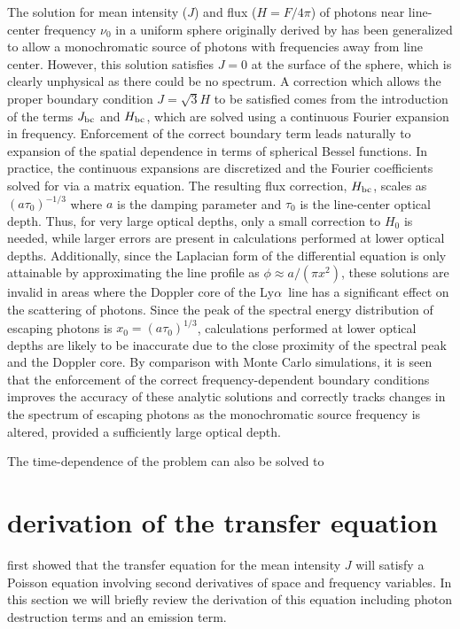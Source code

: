 \documentclass{aastex63}
\newcommand\lya{Ly$\alpha$\ }
\begin{document}
The solution for mean intensity ($J$) and flux ($H = F/4\pi$) of photons near line-center frequency $\nu_0$ in a uniform sphere originally derived by \cite{2006ApJ...649...14D} has been generalized to allow a monochromatic source of photons with frequencies away from line center. However, this solution satisfies $J=0$ at the surface of the sphere, which is clearly unphysical as there could be no spectrum. A correction which allows the proper boundary condition $J=\sqrt{3}H$ to be satisfied comes from the introduction of the terms $J_{\rm bc}$ and $H_{\rm bc}$, which are solved using a continuous Fourier expansion in frequency. Enforcement of the correct boundary term leads naturally to expansion of the spatial dependence in terms of spherical Bessel functions. In practice, the continuous expansions are discretized and the Fourier coefficients solved for via a matrix equation. The resulting flux correction, $H_{\rm bc}$, scales as $(a\tau_0)^{-1/3}$ where $a$ is the damping parameter and $\tau_0$ is the line-center optical depth. Thus, for very large optical depths, only a small correction to $H_0$ is needed, while larger errors are present in calculations performed at lower optical depths. Additionally, since the Laplacian form of the differential equation is only attainable by approximating the line profile as $\phi \approx a/(\pi x^2)$, these solutions are invalid in areas where the Doppler core of the \lya line has a significant effect on the scattering of photons. Since the peak of the spectral energy distribution of escaping photons is $x_0 = (a\tau_0)^{1/3}$, calculations performed at lower optical depths are likely to be inaccurate due to the close proximity of the spectral peak and the Doppler core. By comparison with Monte Carlo simulations, it is seen that the enforcement of the correct frequency-dependent boundary conditions improves the accuracy of these analytic solutions and correctly tracks changes in the spectrum of escaping photons as the monochromatic source frequency is altered, provided a sufficiently large optical depth.

The time-dependence of the problem can also be solved to 

\acknowledgments

\appendix
\restartappendixnumbering
\section{ derivation of the transfer equation } \label{app:rteqn_derivation}

\citet{1973MNRAS.162...43H} first showed that the transfer equation for the mean  intensity $J$ will satisfy a Poisson equation involving second derivatives of space and frequency variables. In this section we will briefly review the derivation of this equation including photon destruction terms and an emission term.
\end{document}
